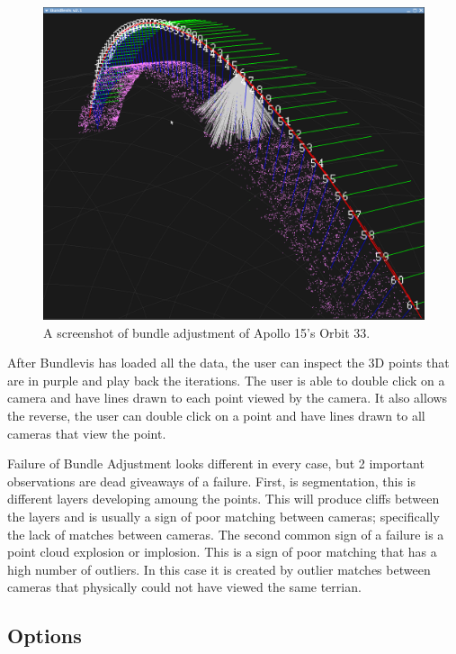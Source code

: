 \begin{figure}[htp]
  \begin{center}
  \includegraphics[width=5in]{images/bundlevis_apollo.png}
  \end{center}
  \caption{ A screenshot of bundle adjustment of Apollo 15's Orbit 33. }
  \label{fig:bundlevis}
\end{figure}

After Bundlevis has loaded all the data, the user can inspect the 3D
points that are in purple and play back the iterations. The user is
able to double click on a camera and have lines drawn to each point
viewed by the camera. It also allows the reverse, the user can double
click on a point and have lines drawn to all cameras that view the
point.

Failure of Bundle Adjustment looks different in every case,
but 2 important observations are dead giveaways of a failure. First,
is segmentation, this is different layers developing amoung the
points. This will produce cliffs between the layers and is usually a
sign of poor matching between cameras; specifically the lack of
matches between cameras. The second common sign of a failure is a
point cloud explosion or implosion. This is a sign of poor matching
that has a high number of outliers. In this case it is created
by outlier matches between cameras that physically could not have viewed the
same terrian.


\subsection{Options}

